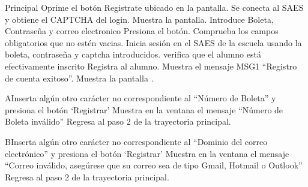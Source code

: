 \begin{UCtrayectoria}{Principal}
	\UCpaso[\UCactor] Oprime el botón Registrate ubicado en la pantalla.
	\UCpaso Se conecta al SAES y obtiene el CAPTCHA del login.
	\UCpaso Muestra la pantalla.
	\UCpaso[\UCactor] Introduce Boleta, Contraseña y correo electronico
	\UCpaso[\UCactor] Presiona el botón.
	\UCpaso Comprueba los campos obligatorios que no estén vacias.
	\UCpaso Inicia sesión en el SAES de la escuela usando la boleta, contraseña y captcha introducidos.
	\UCpaso verifica que el alumno está efectivamente inscrito  
	\UCpaso Registra al alumno.
	\UCpaso Muestra el mensaje MSG1 “Registro de cuenta exitoso”.
	\UCpaso Muestra la pantalla .
\end{UCtrayectoria}

\begin{UCtrayectoriaA}{A}{Inserta algún otro carácter no correspondiente al “Número de Boleta” y presiona el botón ‘Registrar’}
	\UCpaso Muestra en la ventana el mensaje “Número de Boleta inválido”
	\UCpaso Regresa al paso 2 de la trayectoria principal.
\end{UCtrayectoriaA}

\begin{UCtrayectoriaA}{B}{Inserta algún otro carácter no correspondiente al “Dominio del correo electrónico” y presiona el botón ‘Registrar’}
	\UCpaso Muestra en la ventana el mensaje “Correo inválido, asegúrese que su correo sea de tipo Gmail, Hotmail o Outlook”
	\UCpaso Regresa al paso 2 de la trayectoria principal.
\end{UCtrayectoriaA}